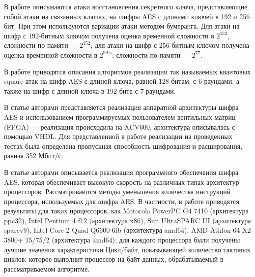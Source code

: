 \documentclass{./civarticle}
\begin{document}
    \begin{figure}[h!]
    \end{figure}

В работе \cite{aes6} описываются атаки восстановления секретного ключа, представляющие собой атаки на связанных ключах, на шифры AES с длинами ключей в 192 и 256 бит. При этом используются вариации атаки методом бумеранга. Для атаки на шифр с 192-битным ключом получена оценка временной сложности в $2^{132}$, сложности по памяти --- $2^{152}$; для атаки на шифр с 256-битным ключом получена оценка временной сложности в $2^{99.5}$, сложности по памяти --- $2^{77}$.

В работе \cite{aes3} приводятся описания алгоритмов реализации так называемых квантовых square атак на шифр AES с длиной ключа, равной 128 битам, с 6 раундами, а также на шифр с длиной ключа в 192 бита с 7 раундами.

В статье \cite{aes4} авторами представляется реализация аппаратной архитектуры шифра AES и использованием программируемых пользователем вентильных матриц (FPGA) --- реализация происходила на XCV600, архитектура описывалась с помощью VHDL.  Для представленной в работе реализации на проведенных тестах была определена пропускная способность шифрования и расширования, равная 352 Мбит/с. 

В статье \cite{aes5} авторами описывается реализация программного обеспечения шифра AES, которая обеспечивает высокую скорость на различных типах архитектур процессоров. Рассматриваются методы уменьшения количества инструкций процессора, используемых для шифра AES. В частности, в работе приводятся результаты для таких процессоров, как  Motorola PowerPC G4 7410 (архитектура ppc32), Intel Pentium 4 f12 (архитектура x86), Sun UltraSPARC III (архитектура sparcv9), Intel Core 2 Quad Q6600 6fb (архитектура amd64), AMD Athlon 64 X2 3800+ 15/75/2 (архитектура amd64): для каждого процессора были получены лучшие значения характеристики Цикл/байт, показывающей количество тактовых циклов, которое выполнит процессор на байт данных, обрабатываемый в рассматриваемом алгоритме.
\end{document}

